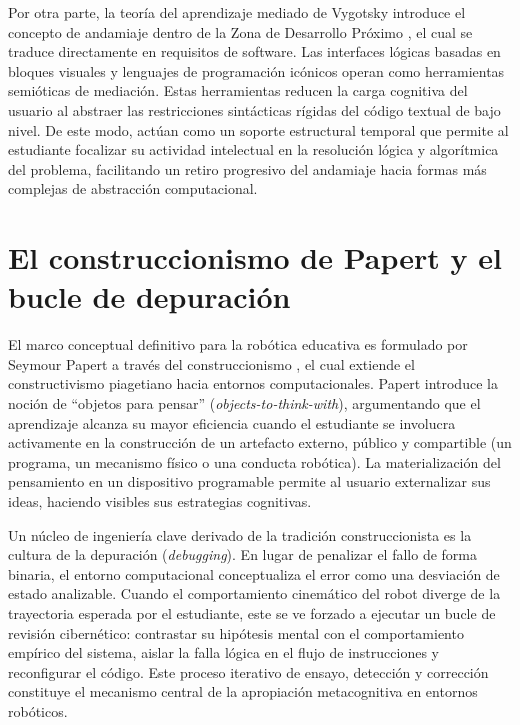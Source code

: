 \documentclass{prgrado}
\begin{document}
Por otra parte, la teoría del aprendizaje mediado de Vygotsky introduce el concepto de andamiaje dentro de la Zona de Desarrollo Próximo \cite{springernatureNDzdp}, el cual se traduce directamente en requisitos de software. Las interfaces lógicas basadas en bloques visuales y lenguajes de programación icónicos operan como herramientas semióticas de mediación. Estas herramientas reducen la carga cognitiva del usuario al abstraer las restricciones sintácticas rígidas del código textual de bajo nivel. De este modo, actúan como un soporte estructural temporal que permite al estudiante focalizar su actividad intelectual en la resolución lógica y algorítmica del problema, facilitando un retiro progresivo del andamiaje hacia formas más complejas de abstracción computacional.

\section{El construccionismo de Papert y el bucle de depuración}

El marco conceptual definitivo para la robótica educativa es formulado por Seymour Papert a través del construccionismo \cite{papert1980mindstorms,harel1991constructionism}, el cual extiende el constructivismo piagetiano hacia entornos computacionales. Papert introduce la noción de \enquote{objetos para pensar} (\textit{objects-to-think-with}), argumentando que el aprendizaje alcanza su mayor eficiencia cuando el estudiante se involucra activamente en la construcción de un artefacto externo, público y compartible (un programa, un mecanismo físico o una conducta robótica). La materialización del pensamiento en un dispositivo programable permite al usuario externalizar sus ideas, haciendo visibles sus estrategias cognitivas.

Un núcleo de ingeniería clave derivado de la tradición construccionista es la cultura de la depuración (\textit{debugging}). En lugar de penalizar el fallo de forma binaria, el entorno computacional conceptualiza el error como una desviación de estado analizable. Cuando el comportamiento cinemático del robot diverge de la trayectoria esperada por el estudiante, este se ve forzado a ejecutar un bucle de revisión cibernético: contrastar su hipótesis mental con el comportamiento empírico del sistema, aislar la falla lógica en el flujo de instrucciones y reconfigurar el código. Este proceso iterativo de ensayo, detección y corrección constituye el mecanismo central de la apropiación metacognitiva en entornos robóticos.
\end{document}

